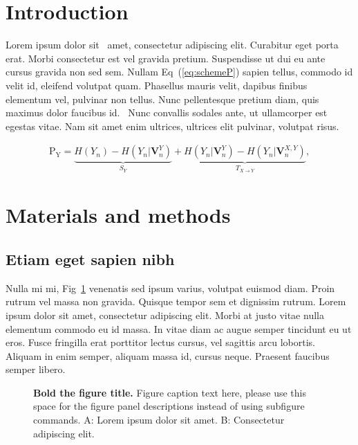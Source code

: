 \documentclass[10pt,letterpaper]{article}
\begin{document}
\section*{Introduction}
Lorem ipsum dolor sit~\cite{bib1} amet, consectetur adipiscing elit. Curabitur eget porta erat. Morbi consectetur est vel gravida pretium. Suspendisse ut dui eu ante cursus gravida non sed sem. Nullam Eq~(\ref{eq:schemeP}) sapien tellus, commodo id velit id, eleifend volutpat quam. Phasellus mauris velit, dapibus finibus elementum vel, pulvinar non tellus. Nunc pellentesque pretium diam, quis maximus dolor faucibus id.~\cite{bib2} Nunc convallis sodales ante, ut ullamcorper est egestas vitae. Nam sit amet enim ultrices, ultrices elit pulvinar, volutpat risus.

\begin{eqnarray}
\label{eq:schemeP}
	\mathrm{P_Y} = \underbrace{H(Y_n) - H(Y_n|\mathbf{V}^{Y}_{n})}_{S_Y} + \underbrace{H(Y_n|\mathbf{V}^{Y}_{n})- H(Y_n|\mathbf{V}^{X,Y}_{n})}_{T_{X\rightarrow Y}},
\end{eqnarray}

\section*{Materials and methods}
\subsection*{Etiam eget sapien nibh}

Nulla mi mi, Fig~\ref{fig1} venenatis sed ipsum varius, volutpat euismod diam. Proin rutrum vel massa non gravida. Quisque tempor sem et dignissim rutrum. Lorem ipsum dolor sit amet, consectetur adipiscing elit. Morbi at justo vitae nulla elementum commodo eu id massa. In vitae diam ac augue semper tincidunt eu ut eros. Fusce fringilla erat porttitor lectus cursus,  vel sagittis arcu lobortis. Aliquam in enim semper, aliquam massa id, cursus neque. Praesent faucibus semper libero.

\begin{figure}[!h]
\caption{{\bf Bold the figure title.}
Figure caption text here, please use this space for the figure panel descriptions instead of using subfigure commands. A: Lorem ipsum dolor sit amet. B: Consectetur adipiscing elit.}
\label{fig1}
\end{figure}
\end{document}
